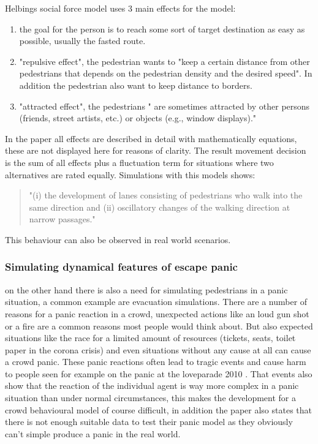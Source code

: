 \documentclass{acmsiggraph}               %
\begin{document}
Helbings social force model uses 3 main effects for the model:
\begin{enumerate}
    \item the goal for the person is to reach some sort of target destination as easy as possible, usually the fasted route.
    \item "repulsive effect", the pedestrian wants to "keep a certain distance from other pedestrians that depends on the pedestrian density and the desired speed". In addition the pedestrian also want to keep distance to borders.  
    \item "attracted effect", the pedestrians " are sometimes attracted by other persons (friends, street artists, etc.) or objects (e.g., window displays)."
\end{enumerate}
In the paper all effects are described in detail with mathematically equations, these are not displayed here for reasons of clarity. The result movement decision is the sum of all effects plus a fluctuation term for situations where two alternatives are rated equally. Simulations with this models shows:
\begin{quote}
    "(i) the development of lanes consisting of pedestrians who walk into the same direction and (ii) oscillatory changes of the walking direction at narrow passages."
\end{quote}
This behaviour can also be observed in real world scenarios. 

\subsubsection{Simulating dynamical features of escape panic}\cite{helbing_simulating_2000} on the other hand there is also a need for simulating pedestrians in a panic situation, a common example are evacuation simulations.
There are a number of reasons for a panic reaction in a crowd, unexpected actions like an loud gun shot or a fire are a common reasons most people would think about. But also expected situations like the race for a limited amount of resources (tickets, seats, toilet paper in the corona crisis)  and even situations without any cause at all can cause a crowd panic. These panic reactions often lead to tragic events and cause harm to people seen for example on the panic at the loveparade 2010 \cite{dumbs_massenpanik_2010} . That events also show that the reaction of the individual agent is way more complex in a panic situation than under normal circumstances, this makes the development for a crowd behavioural model of course difficult, in addition the paper also states that there is not enough suitable data to test their panic model as they obviously can't simple produce a panic in the real world. 
\end{document}
